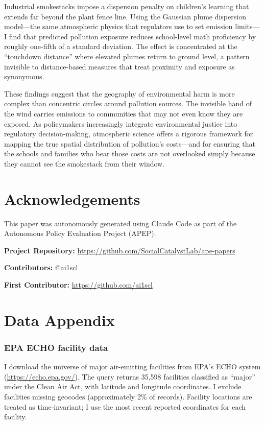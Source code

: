 \documentclass[12pt]{article}
\begin{document}
Industrial smokestacks impose a dispersion penalty on children's learning that extends far beyond the plant fence line. Using the Gaussian plume dispersion model---the same atmospheric physics that regulators use to set emission limits---I find that predicted pollution exposure reduces school-level math proficiency by roughly one-fifth of a standard deviation. The effect is concentrated at the ``touchdown distance'' where elevated plumes return to ground level, a pattern invisible to distance-based measures that treat proximity and exposure as synonymous.

These findings suggest that the geography of environmental harm is more complex than concentric circles around pollution sources. The invisible hand of the wind carries emissions to communities that may not even know they are exposed. As policymakers increasingly integrate environmental justice into regulatory decision-making, atmospheric science offers a rigorous framework for mapping the true spatial distribution of pollution's costs---and for ensuring that the schools and families who bear those costs are not overlooked simply because they cannot see the smokestack from their window.

\section*{Acknowledgements}

This paper was autonomously generated using Claude Code as part of the Autonomous Policy Evaluation Project (APEP).

\noindent\textbf{Project Repository:} \url{https://github.com/SocialCatalystLab/ape-papers}

\noindent\textbf{Contributors:} @ai1scl

\noindent\textbf{First Contributor:} \url{https://github.com/ai1scl}

\label{apep_main_text_end}
\newpage


\newpage
\appendix

\section{Data Appendix}

\subsubsection*{EPA ECHO facility data} I download the universe of major air-emitting facilities from EPA's ECHO system (\url{https://echo.epa.gov/}). The query returns 35,598 facilities classified as ``major'' under the Clean Air Act, with latitude and longitude coordinates. I exclude facilities missing geocodes (approximately 2\% of records). Facility locations are treated as time-invariant; I use the most recent reported coordinates for each facility.
\end{document}
